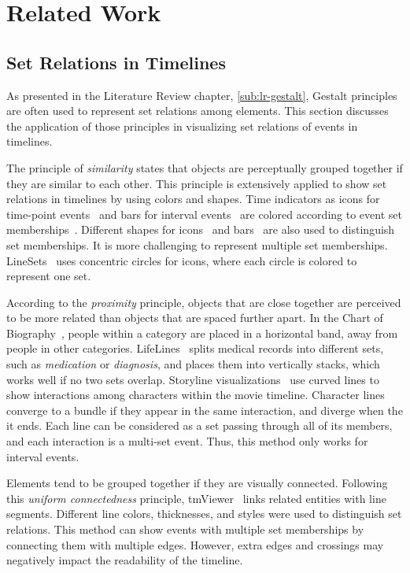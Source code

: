 \section{Related Work}
\label{sub:ts-review}

\subsection{Set Relations in Timelines}
As presented in the Literature Review chapter, \autoref{sub:lr-gestalt}, Gestalt principles are often used to represent set relations among elements. This section discusses the application of those principles in visualizing set relations of events in timelines.

The principle of \textit{similarity} states that objects are perceptually grouped together if they are similar to each other. This principle is extensively applied to show set relations in timelines by using colors and shapes. Time indicators as icons for time-point events~\cite{SimileTimeline2009} and bars for interval events~\cite{Wang2008} are colored according to event set memberships~\cite{SimileTimeline2009}. Different shapes for icons~\cite{TimeGlider2016} and bars~\cite{Plaisant1998} are also used to distinguish set memberships. It is more challenging to represent multiple set memberships. LineSets~\cite{Alper2011} uses concentric circles for icons, where each circle is colored to represent one set.

According to the \textit{proximity} principle, objects that are close together are perceived to be more related than objects that are spaced further apart. In the Chart of Biography~\cite{Priestley1765}, people within a category are placed in a horizontal band, away from people in other categories. LifeLines~\cite{Plaisant1998} splits medical records into different sets, such as \textit{medication} or \textit{diagnosis}, and places them into vertically stacks, which works well if no two sets overlap. Storyline visualizations~\cite{Tanahashi2012,Liu2013} use curved lines to show interactions among characters within the movie timeline. Character lines converge to a bundle if they appear in the same interaction, and diverge when the it ends. Each line can be considered as a set passing through all of its members, and each interaction is a multi-set event. Thus, this method only works for interval events.

Elements tend to be grouped together if they are visually connected. Following this \textit{uniform connectedness} principle, tmViewer~\cite{Kumar1998} links related entities with line segments. Different line colors, thicknesses, and styles were used to distinguish set relations. This method can show events with multiple set memberships by connecting them with multiple edges. However, extra edges and crossings may negatively impact the readability of the timeline.

